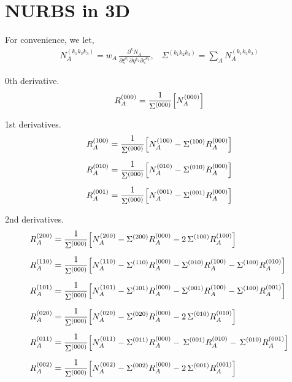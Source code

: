 \documentclass[oneside, english, reqno]{amsart}
\theoremstyle{plain}
\theoremstyle{plain}
\theoremstyle{plain}
\theoremstyle{plain}
\theoremstyle{definition}
\theoremstyle{definition}
\theoremstyle{definition}
\numberwithin{equation}{section}
\begin{document}
\newpage
\section{NURBS in 3D}
\label{sec:3}
\noindent For convenience, we let,
\begin{align*}
	N_{A}^{(k_{1}k_{2}k_{3})} = w_{A}\,\frac{\partial^{k}N_{A}}{\partial\xi^{k_{1}}\partial\eta^{k_{2}}\partial\zeta^{k_{3}}},\,\,\,\,\,\Sigma^{(k_{1}k_{2}k_{3})} = \sum_{A}N_{A}^{(k_{1}k_{2}k_{3})}
\end{align*} \vspace{3pt}

\noindent 0th derivative.
\begin{align*}
	R_{A}^{(000)} = \frac{1}{\Sigma^{(000)}}\Bigl[N_{A}^{(000)}\Bigr]
\end{align*} \vspace{3pt}

\noindent 1st derivatives.
\begin{align*}
	&R_{A}^{(100)} = \frac{1}{\Sigma^{(000)}}\Bigl[N_{A}^{(100)} - \Sigma^{(100)}R_{A}^{(000)}\Bigr] \\[6pt]
	&R_{A}^{(010)} = \frac{1}{\Sigma^{(000)}}\Bigl[N_{A}^{(010)} - \Sigma^{(010)}R_{A}^{(000)}\Bigr] \\[6pt]
	&R_{A}^{(001)} = \frac{1}{\Sigma^{(000)}}\Bigl[N_{A}^{(001)} - \Sigma^{(001)}R_{A}^{(000)}\Bigr]
\end{align*} \vspace{3pt}

\noindent 2nd derivatives.
\begin{align*}
	&R_{A}^{(200)} = \frac{1}{\Sigma^{(000)}}\Bigl[N_{A}^{(200)} - \Sigma^{(200)}R_{A}^{(000)} - 2\,\Sigma^{(100)}R_{A}^{(100)}\Bigr] \\[6pt]
	&R_{A}^{(110)} = \frac{1}{\Sigma^{(000)}}\Bigl[N_{A}^{(110)} - \Sigma^{(110)}R_{A}^{(000)} - \Sigma^{(010)}R_{A}^{(100)} - \Sigma^{(100)}R_{A}^{(010)}\Bigr] \\[6pt]
	&R_{A}^{(101)} = \frac{1}{\Sigma^{(000)}}\Bigl[N_{A}^{(101)} - \Sigma^{(101)}R_{A}^{(000)} - \Sigma^{(001)}R_{A}^{(100)} - \Sigma^{(100)}R_{A}^{(001)}\Bigr] \\[6pt]
	&R_{A}^{(020)} = \frac{1}{\Sigma^{(000)}}\Bigl[N_{A}^{(020)} - \Sigma^{(020)}R_{A}^{(000)} - 2\,\Sigma^{(010)}R_{A}^{(010)}\Bigr] \\[6pt]
	&R_{A}^{(011)} = \frac{1}{\Sigma^{(000)}}\Bigl[N_{A}^{(011)} - \Sigma^{(011)}R_{A}^{(000)} - \,\Sigma^{(001)}R_{A}^{(010)} - \,\Sigma^{(010)}R_{A}^{(001)}\Bigr] \\[6pt]
	&R_{A}^{(002)} = \frac{1}{\Sigma^{(000)}}\Bigl[N_{A}^{(002)} - \Sigma^{(002)}R_{A}^{(000)} - 2\,\Sigma^{(001)}R_{A}^{(001)}\Bigr]
\end{align*} \vspace{3pt}
\end{document}
